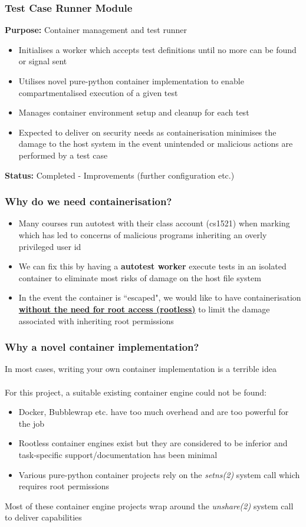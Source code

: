 \documentclass[xcolor, handout]{beamer}
\begin{document}
\begin{frame}
	\frametitle{Test Case Runner Module}
	\textbf{Purpose:} Container management and test runner\\
	\begin{itemize}
		\item Initialises a worker which accepts test definitions until no more can be found or signal sent
			\pause
		\item Utilises novel pure-python container implementation to enable compartmentalised execution of a given test
			\pause
		\item Manages container environment setup and cleanup for each test
			\pause
		\item Expected to deliver on security needs as containerisation minimises the damage to the host system in the event unintended or malicious actions are performed by a test case
			\pause
	\end{itemize}
	\textbf{Status:} Completed - Improvements (further configuration etc.)
\end{frame}
\begin{frame}
	\frametitle{Why do we need containerisation?}
	\begin{itemize}
		\setlength\itemsep{1em}
		\item Many courses run autotest with their class account (cs1521) when marking which has led to concerns of malicious programs inheriting an overly privileged user id
			\pause
		\item We can fix this by having a \textbf{autotest worker} execute tests in an isolated container to eliminate most risks of damage on the host file system
			\pause
		\item In the event the container is ``escaped", we would like to have containerisation \textbf{\underline{without the need for root access (rootless)}} to limit the damage associated with inheriting root permissions
	\end{itemize}
\end{frame}
\begin{frame}
	\frametitle{Why a novel container implementation?}
	In most cases, writing your own container implementation is a terrible idea
	\\~\\
	For this project, a suitable existing container engine could not be found:
	\begin{itemize}
		\setlength\itemsep{1em}
		\item Docker, Bubblewrap etc. have too much overhead and are too powerful for the job
			\pause
		\item Rootless container engines exist but they are considered to be inferior and task-specific support/documentation has been minimal
			\pause
		\item Various pure-python container projects rely on the \textit{setns(2)} system call which requires root permissions
			\pause
	\end{itemize}
	Most of these container engine projects wrap around the \textit{unshare(2)} system call to deliver capabilities
\end{frame}
\end{document}
